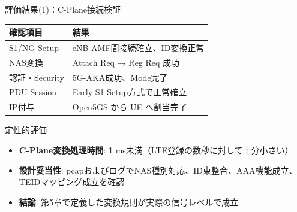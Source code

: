 \documentclass[dvipdfmx,11pt,aspectratio=169]{beamer}
\begin{document}
\begin{frame}{評価結果(1)：C-Plane接続検証}
  \begin{table}
    \tiny
    \begin{tabular}{|l|p{5.5cm}|}
      \hline
      \textbf{確認項目} & \textbf{結果} \\
      \hline
      S1/NG Setup & eNB-AMF間接続確立、ID変換正常 \\
      \hline
      NAS変換 & Attach Req → Reg Req 成功 \\
      \hline
      認証・Security & 5G-AKA成功、Mode完了 \\
      \hline
      PDU Session & Early S1 Setup方式で正常確立 \\
      \hline
      IP付与 & Open5GS から UE へ割当完了 \\
      \hline
    \end{tabular}
  \end{table}

  \vspace{0.3cm}
  \begin{block}{定性的評価}
    \begin{itemize}
      \item \textbf{C-Plane変換処理時間}: 1 ms未満（LTE登録の数秒に対して十分小さい）
      \item \textbf{設計妥当性}: pcapおよびログでNAS種別対応、ID束整合、AAA機能成立、TEIDマッピング成立を確認
      \item \textbf{結論}: 第5章で定義した変換規則が実際の信号レベルで成立
    \end{itemize}
  \end{block}
\end{frame}
\end{document}
